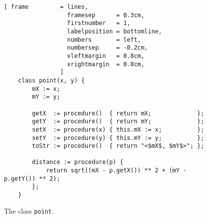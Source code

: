 \begin{figure}[!ht]
\centering
\begin{Verbatim}[ frame         = lines, 
                  framesep      = 0.3cm, 
                  firstnumber   = 1,
                  labelposition = bottomline,
                  numbers       = left,
                  numbersep     = -0.2cm,
                  xleftmargin   = 0.8cm,
                  xrightmargin  = 0.8cm,
                ]
    class point(x, y) {
        mX := x;
        mY := y;
    
        getX  := procedure()  { return mX;             };
        getY  := procedure()  { return mY;             };
        setX  := procedure(x) { this.mX := x;          };
        setY  := procedure(y) { this.mY := y;          };
        toStr := procedure()  { return "<$mX$, $mY$>"; };

        distance := procedure(p) {
            return sqrt((mX - p.getX()) ** 2 + (mY - p.getY()) ** 2);
        };
    }
\end{Verbatim}
\vspace*{-0.3cm}
\caption{The class \texttt{point}.}
\label{fig:point.stlx}
\end{figure}

